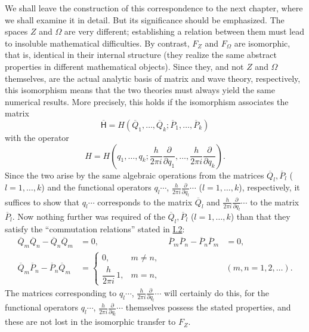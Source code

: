 \documentclass[fontsize=13pt,twoside,openany,headings=normal,parskip=false,bookmarkpackage=false,DIV=calc]{scrbook}
\begin{document}
We shall leave the construction of this correspondence to the next chapter, where we shall examine it in detail. But its significance should be emphasized. The spaces $Z$ and $\Omega$ are very different; establishing a relation between them must lead to insoluble mathematical difficulties. By contrast, $F_Z$ and $F_\Omega$ are isomorphic, that is, identical in their internal structure (they realize the same abstract properties in different mathematical objects). Since they, and not $Z$ and $\Omega$ themselves, are the actual analytic basis of matrix and wave theory, respectively, this isomorphism means that the two theories must always yield the same numerical results. More precisely, this holds if the isomorphism associates the matrix
\[
 \overline{\mathsf{H}}=H(\overline Q_1,\ldots,\overline Q_k;\overline P_1,\ldots,\overline P_k)
\]
with the operator
\[
 H=H\left(q_1,\ldots,q_k;\frac{h}{2\pi i}\frac{\partial}{\partial q_1},
 \ldots,\frac{h}{2\pi i}\frac{\partial}{\partial q_k}\right).
\]
Since the two arise by the same algebraic operations from the matrices $\overline Q_l,\overline P_l$ ($l=1,\ldots,k$) and the functional operators $q_l\cdots$, $\frac{h}{2\pi i}\frac{\partial}{\partial q_l}\cdots$ ($l=1,\ldots,k$), respectively, it suffices to show that $q_l\cdots$ corresponds to the matrix $\overline Q_l$ and $\frac{h}{2\pi i}\frac{\partial}{\partial q_l}\cdots$ to the matrix $\overline P_l$. Now nothing further was required of the $\overline Q_l,\overline P_l$ ($l=1,\ldots,k$) than that they satisfy the ``commutation relations'' stated in \hyperref[sec:I.2]{I.2}:
\begin{align*}
 \overline Q_m\overline Q_n-\overline Q_n\overline Q_m&=0,
 &\overline P_m\overline P_n-\overline P_n\overline P_m&=0,\\
 \overline Q_m\overline P_n-\overline P_n\overline Q_m
 &=\begin{cases}0,&m\ne n,\\\dfrac{h}{2\pi i}\,1,&m=n,\end{cases}
 &&(m,n=1,2,\ldots).
\end{align*}
The matrices corresponding to $q_l\cdots$, $\frac{h}{2\pi i}\frac{\partial}{\partial q_l}\cdots$ will certainly do this, for the functional operators $q_l\cdots$, $\frac{h}{2\pi i}\frac{\partial}{\partial q_l}\cdots$ themselves possess the stated properties, and these are not lost in the isomorphic transfer to $F_Z$.
\hypertarget{origpage-18}{}%
\end{document}
